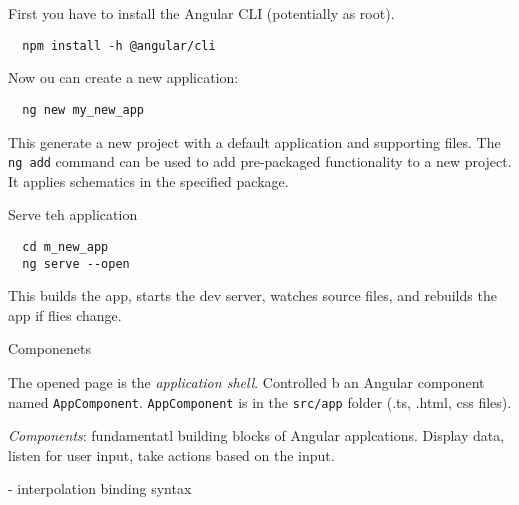 First you have to install the Angular CLI (potentially as root).

\begin{lstlisting}
  npm install -h @angular/cli
\end{lstlisting}


Now ou can create a new application:

\begin{lstlisting}
  ng new my_new_app
\end{lstlisting}

This generate a new project with a default application and supporting
files. The \lstinline$ng add$ command can be used to add pre-packaged
functionality to a new project. It applies schematics in the specified
package.

Serve teh application

\begin{lstlisting}
  cd m_new_app
  ng serve --open
\end{lstlisting}

This builds the app, starts the dev server, watches source files, and
rebuilds the app if flies change.

Componenets

The opened page is the \textit{application shell}. Controlled b an
Angular component named
\lstinline$AppComponent$. \lstinline$AppComponent$ is in the
\lstinline$src/app$ folder (.ts, .html, css files).

\textit{Components}: fundamentatl building blocks of Angular
applcations. Display data, listen for user input, take actions based
on the input.

{{}} - interpolation binding syntax